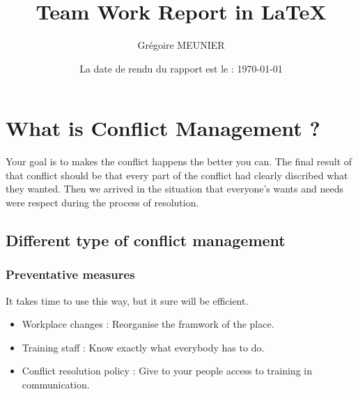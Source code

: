 \documentclass[a4paper,12pt]{report} %
\title{Team Work Report in \LaTeX}
\author{Grégoire MEUNIER}
\date{La date de rendu du rapport est le : \today}
\begin{document}
\maketitle
\tableofcontents

\chapter{What is Conflict Management ?}\newpage
Your goal is to makes the conflict happens the better you can. The final result of that conflict should be that every part of the conflict had clearly discribed what they wanted. Then we arrived in the situation that everyone’s wants and needs were respect during the process of resolution.
\section{Different type of conflict management}
\subsection{Preventative measures}
It takes time to use this way, but it sure will be efficient.
\begin{itemize}
\item Workplace changes : Reorganise the framwork of the place.
\item Training staff : Know exactly what everybody has to do.
\item Conflict resolution policy : Give to your people access to training in communication.
\end{itemize}
\end{document}
